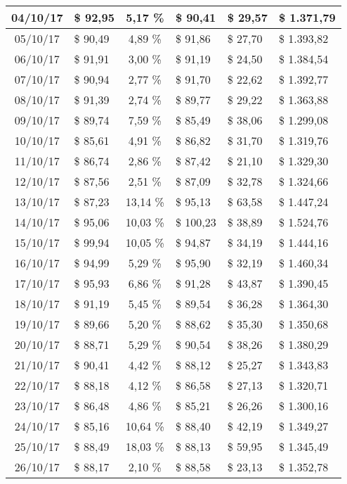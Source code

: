 \begin{center}
\begin{small}
\begin{longtable}{|c|l|c|l|l|l|}
04/10/17 & \$ 92,95 & 5,17 \% & \$ 90,41 & \$ 29,57 & \$ 1.371,79 \\ \hline
05/10/17 & \$ 90,49 & 4,89 \% & \$ 91,86 & \$ 27,70 & \$ 1.393,82 \\ \hline
06/10/17 & \$ 91,91 & 3,00 \% & \$ 91,19 & \$ 24,50 & \$ 1.384,54 \\ \hline
07/10/17 & \$ 90,94 & 2,77 \% & \$ 91,70 & \$ 22,62 & \$ 1.392,77 \\ \hline
08/10/17 & \$ 91,39 & 2,74 \% & \$ 89,77 & \$ 29,22 & \$ 1.363,88 \\ \hline
09/10/17 & \$ 89,74 & 7,59 \% & \$ 85,49 & \$ 38,06 & \$ 1.299,08 \\ \hline
10/10/17 & \$ 85,61 & 4,91 \% & \$ 86,82 & \$ 31,70 & \$ 1.319,76 \\ \hline
11/10/17 & \$ 86,74 & 2,86 \% & \$ 87,42 & \$ 21,10 & \$ 1.329,30 \\ \hline
12/10/17 & \$ 87,56 & 2,51 \% & \$ 87,09 & \$ 32,78 & \$ 1.324,66 \\ \hline
13/10/17 & \$ 87,23 & 13,14 \% & \$ 95,13 & \$ 63,58 & \$ 1.447,24 \\ \hline
14/10/17 & \$ 95,06 & 10,03 \% & \$ 100,23 & \$ 38,89 & \$ 1.524,76 \\ \hline
15/10/17 & \$ 99,94 & 10,05 \% & \$ 94,87 & \$ 34,19 & \$ 1.444,16 \\ \hline
16/10/17 & \$ 94,99 & 5,29 \% & \$ 95,90 & \$ 32,19 & \$ 1.460,34 \\ \hline
17/10/17 & \$ 95,93 & 6,86 \% & \$ 91,28 & \$ 43,87 & \$ 1.390,45 \\ \hline
18/10/17 & \$ 91,19 & 5,45 \% & \$ 89,54 & \$ 36,28 & \$ 1.364,30 \\ \hline
19/10/17 & \$ 89,66 & 5,20 \% & \$ 88,62 & \$ 35,30 & \$ 1.350,68 \\ \hline
20/10/17 & \$ 88,71 & 5,29 \% & \$ 90,54 & \$ 38,26 & \$ 1.380,29 \\ \hline
21/10/17 & \$ 90,41 & 4,42 \% & \$ 88,12 & \$ 25,27 & \$ 1.343,83 \\ \hline
22/10/17 & \$ 88,18 & 4,12 \% & \$ 86,58 & \$ 27,13 & \$ 1.320,71 \\ \hline
23/10/17 & \$ 86,48 & 4,86 \% & \$ 85,21 & \$ 26,26 & \$ 1.300,16 \\ \hline
24/10/17 & \$ 85,16 & 10,64 \% & \$ 88,40 & \$ 42,19 & \$ 1.349,27 \\ \hline
25/10/17 & \$ 88,49 & 18,03 \% & \$ 88,13 & \$ 59,95 & \$ 1.345,49 \\ \hline
26/10/17 & \$ 88,17 & 2,10 \% & \$ 88,58 & \$ 23,13 & \$ 1.352,78 \\ \hline

\end{longtable}
\end{small}
\end{center}
